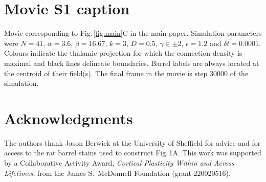 \documentclass[9pt,lineno]{elife}
\newcommand{\MPtwo}[1]{\textcolor{colmptwo}{#1}}
\begin{document}
\section{Movie S1 caption}

Movie corresponding to Fig.\,\ref{fig:main}C in the main paper. Simulation parameters were
\MPtwo{$N=41$, $\alpha=3.6$, $\beta=16.67$, $k=3$, $D=0.5$, $\gamma\in\pm 2$,
$\epsilon=1.2$ and $\delta{t}=0.0001$}. Colours indicate the thalamic
projection for which the connection density is maximal and black lines delineate
boundaries. \MPtwo{Barrel labels are
  always located at the centroid of their field(s).} The final frame in the movie
is step 30000 of the simulation.

\section{Acknowledgments}

The authors thank Jason Berwick at the University of Sheffield for advice and
for access to the rat barrel stains used to construct Fig.\,1A. This work was
supported by a Collaborative Activity Award, \emph{Cortical Plasticity Within
  and Across Lifetimes}, from the James S.~McDonnell Foundation (grant
220020516).


\end{document}
